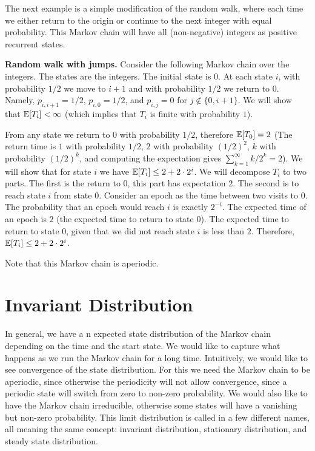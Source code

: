 The next example is a simple modification of the random walk, where each time we either return to the origin or continue to the next integer with equal probability. 
This Markov chain will have all (non-negative) integers as positive recurrent states.

\begin{example}
{\bf Random walk with jumps.}
%
Consider the following Markov chain over the integers. The states
are the integers. The initial state is $0$. At each state $i$, with
probability $1/2$ we move to $i+1$ and with probability $1/2$ we
return to $0$. Namely, $p_{i,i+1}=1/2$, $p_{i,0}=1/2$, and $p_{i,j}
=0$ for $j \not\in \{0,i+ 1\}$. We will show that $\mathbb{E}[T_i]<\infty$
(which implies that $T_i$ is finite with probability $1$).

From any state we return to $0$ with probability $1/2$, therefore
$\mathbb{E}[T_0]=2$ (The return time is $1$ with probability $1/2$, $2$ with probability $(1/2)^2$, $k$ with probability $(1/2)^k$, and computing the expectation gives $\sum_{k=1}^\infty k/2^k = 2$). We will show that for state $i$ we have
$\mathbb{E}[T_i]\leq2+2\cdot 2^{i}$. We will decompose $T_i$ to two parts. The
first is the return to $0$, this part has expectation $2$. The
second is to reach state $i$ from state $0$. Consider an epoch as
the time between two visits to $0$. The probability that an epoch
would reach $i$ is exactly $2^{-i}$. The expected time of an epoch
is $2$ (the expected time to return to state $0$). The expected time
to return to state $0$, given that we did not reach state $i$ is
less than $2$. Therefore, $\mathbb{E}[T_i]\leq 2+2\cdot 2^{i}$.

Note that this Markov chain is aperiodic.
\end{example}



\section{Invariant Distribution} %

In general, we have a n expected state distribution of the Markov chain depending on the time and the start state.
We would like to capture what happens as we run the Markov chain for a long time. 
Intuitively, we would like to see convergence of the state distribution.
For this we need the Markov chain to be aperiodic, since otherwise the periodicity will not allow convergence, since a periodic state will switch from zero to non-zero probability.
We would also like to have the Markov chain irreducible, otherwise some states will have a vanishing but non-zero probability.
This limit distribution is called in a few different names, all meaning the same concept: invariant
distribution, stationary distribution, and steady state distribution.

